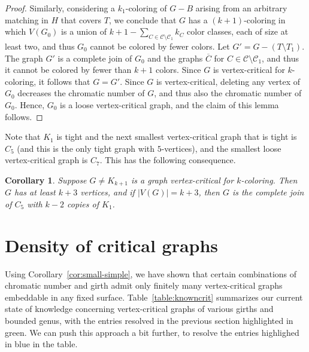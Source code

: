 \documentclass[12pt,twoside,openright,a4paper]{book}
\newtheorem{corollary}[theorem]{Corollary}
\newcommand{\CC}{\mathcal{C}}
\begin{document}
\begin{proof}
Similarly, considering a $k_1$-coloring of $G-B$ arising from an arbitrary matching in $H$ that covers $T$, we conclude that $G$ has a $(k+1)$-coloring
in which $V(G_0)$ is a union of $k+1-\sum_{C\in \CC\setminus \CC_1} k_C$ color classes, each of size at least two, and thus $G_0$ cannot be colored by fewer colors.
Let $G'=G-(T\setminus T_1)$.  The graph $G'$ is a complete join of $G_0$ and the graphs $\overline{C}$ for $C\in\CC\setminus \CC_1$, and thus it cannot be colored
by fewer than $k+1$ colors.  Since $G$ is vertex-critical for $k$-coloring, it follows that $G=G'$.  Since $G$ is vertex-critical, deleting any vertex of $G_0$ decreases
the chromatic number of $G$, and thus also the chromatic number of $G_0$.  Hence, $G_0$ is a loose vertex-critical graph, and the claim of this lemma follows.
\end{proof}

Note that $K_1$ is tight and the next smallest vertex-critical graph that is tight is $C_5$ (and this is the only tight graph with $5$-vertices), and the smallest loose vertex-critical graph is $C_7$.
This has the following consequence.
\begin{corollary}\label{cor:smallestcrit}
Suppose $G\neq K_{k+1}$ is a graph vertex-critical for $k$-coloring.  Then $G$ has at least $k+3$ vertices, and if $|V(G)|=k+3$, then $G$ is the complete join of $C_5$ with $k-2$ copies of $K_1$.
\end{corollary}

\section{Density of critical graphs}

Using Corollary~\ref{cor:small-simple}, we have shown that certain combinations of chromatic number and girth admit only
finitely many vertex-critical graphs embeddable in any fixed surface.  Table~\ref{table:knowncrit} summarizes our current state of knowledge
concerning vertex-critical graphs of various girths and bounded genus,  with the entries resolved in the previous section highlighted in green.
We can push this approach a bit further, to resolve the entries highlighed in blue in the table.
\end{document}
